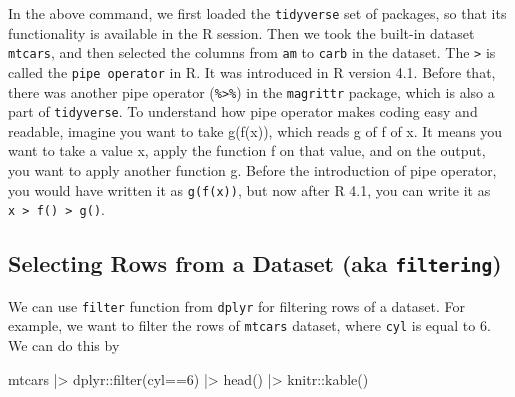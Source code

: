 \documentclass[
  letterpaper,
  paper =a4,
  twoside,
  openright,
  headsepline,
  footsepline,
  listof = totocnumbered,
  chapterprefix = true,
  firstiscover,
  parskip = full*]{scrbook}
\newenvironment{Shaded}{\begin{snugshade}}{\end{snugshade}}
\newcommand{\DecValTok}[1]{\textcolor[rgb]{0.68,0.00,0.00}{#1}}
\newcommand{\FunctionTok}[1]{\textcolor[rgb]{0.28,0.35,0.67}{#1}}
\newcommand{\NormalTok}[1]{\textcolor[rgb]{0.00,0.23,0.31}{#1}}
\newcommand{\SpecialCharTok}[1]{\textcolor[rgb]{0.37,0.37,0.37}{#1}}
\begin{document}
In the above command, we first loaded the \texttt{tidyverse} set of
packages, so that its functionality is available in the R session. Then
we took the built-in dataset \texttt{mtcars}, and then selected the
columns from \texttt{am} to \texttt{carb} in the dataset. The
\texttt{\textbar{}\textgreater{}} is called the \texttt{pipe\ operator}
in R. It was introduced in R version 4.1. Before that, there was another
pipe operator (\texttt{\%\textgreater{}\%}) in the \texttt{magrittr}
package, which is also a part of \texttt{tidyverse}. To understand how
pipe operator makes coding easy and readable, imagine you want to take
g(f(x)), which reads g of f of x. It means you want to take a value x,
apply the function f on that value, and on the output, you want to apply
another function g. Before the introduction of pipe operator, you would
have written it as \texttt{g(f(x))}, but now after R 4.1, you can write
it as
\texttt{x\ \textbar{}\textgreater{}\ f()\ \textbar{}\textgreater{}\ g()}.

\subsection{\texorpdfstring{Selecting Rows from a Dataset (aka
\texttt{filtering})}{Selecting Rows from a Dataset (aka filtering)}}\label{selecting-rows-from-a-dataset-aka-filtering}

We can use \texttt{filter} function from \texttt{dplyr} for filtering
rows of a dataset. For example, we want to filter the rows of
\texttt{mtcars} dataset, where \texttt{cyl} is equal to 6. We can do
this by

\begin{Shaded}
\begin{Highlighting}[]
\NormalTok{mtcars }\SpecialCharTok{|\textgreater{}}\NormalTok{ dplyr}\SpecialCharTok{::}\FunctionTok{filter}\NormalTok{(cyl}\SpecialCharTok{==}\DecValTok{6}\NormalTok{) }\SpecialCharTok{|\textgreater{}} \FunctionTok{head}\NormalTok{() }\SpecialCharTok{|\textgreater{}}\NormalTok{ knitr}\SpecialCharTok{::}\FunctionTok{kable}\NormalTok{()}
\end{Highlighting}
\end{Shaded}
\end{document}
